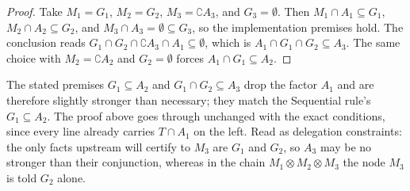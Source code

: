 \begin{proof}
Take $M_1 = G_1$, $M_2 = G_2$, $M_3 = \complement A_3$, and $G_3 = \emptyset$. Then $M_1 \cap A_1 \subseteq G_1$, $M_2 \cap A_2 \subseteq G_2$, and $M_3 \cap A_3 = \emptyset \subseteq G_3$, so the implementation premises hold. The conclusion reads $G_1 \cap G_2 \cap \complement A_3 \cap A_1 \subseteq \emptyset$, which is $A_1 \cap G_1 \cap G_2 \subseteq A_3$. The same choice with $M_2 = \complement A_2$ and $G_2 = \emptyset$ forces $A_1 \cap G_1 \subseteq A_2$.
\end{proof}

\begin{remark}
The stated premises $G_1 \subseteq A_2$ and $G_1 \cap G_2 \subseteq A_3$ drop the factor $A_1$ and are therefore slightly stronger than necessary; they match the Sequential rule's $G_1 \subseteq A_2$. The proof above goes through unchanged with the exact conditions, since every line already carries $T \cap A_1$ on the left. Read as delegation constraints: the only facts upstream will certify to $M_3$ are $G_1$ and $G_2$, so $A_3$ may be no stronger than their conjunction, whereas in the chain $M_1 \otimes M_2 \otimes M_3$ the node $M_3$ is told $G_2$ alone.
\end{remark}
